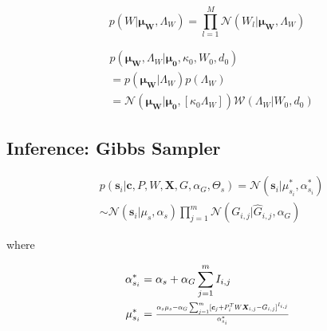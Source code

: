 \documentclass[10pt]{proc}
\begin{document}
\begin{equation}
    p(W | \bm{\mu_W}, \Lambda_W) =
        \prod_{l=1}^M \mathcal{N}(W_l | \bm{\mu_W}, \Lambda_W)
\end{equation}

\begin{equation}
\begin{aligned}
    &p(\bm{\mu_W}, \Lambda_W | \bm{\mu_0}, \kappa_0, W_0, d_0) \\
        & = p(\bm{\mu_W} | \Lambda_W) p(\Lambda_W) \\
        & = \mathcal{N}(\bm{\mu_W} | \bm{\mu_0}, [\kappa_0 \Lambda_W])
            \mathcal{W}(\Lambda_W | W_0, d_0)
\end{aligned}
\end{equation}


\subsection{Inference: Gibbs Sampler}

\begin{mdframed}[style=eqbox]
\begin{equation} \label{eqn:cpd-s}
\begin{aligned}
    &p(\bm{s}_i | \bm{c}, P, W, \bm{X}, G, \alpha_G, \Theta_s)
        = \mathcal{N}(\bm{s}_i | \mu_{s_i}^*, \alpha_{s_i}^*) \\
        & \sim \mathcal{N}(\bm{s}_i | \mu_s, \alpha_s)
               \prod_{j=1}^m \mathcal{N}(G_{i,j} | \hat{G}_{i,j}, \alpha_G)
\end{aligned}
\end{equation}

where

\begin{align}
    \alpha_{s_i}^* &= \begin{aligned}[t]
        \alpha_s + \alpha_G \sum_{j=1}^m I_{i,j}
    \end{aligned}\\
%
    \mu_{s_i}^* &= \begin{aligned}[t]
        \hstretch{0.8}{\vstretch{0.9}{
            \frac{
                \alpha_s\mu_s -
                \alpha_G \sum_{j=1}^m
                    [\bm{c}_j + P_i^TW\bm{X}_{i,j} - G_{i,j} ]^{I_{i,j}}}
            {\alpha_{s_i}^*}}}
    \end{aligned}
\end{align}
\end{mdframed}
\end{document}

